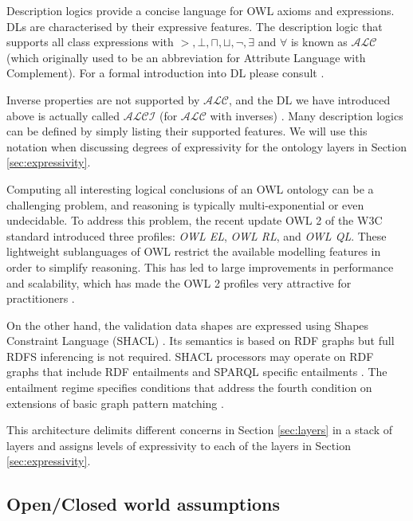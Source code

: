 	Description logics provide a concise language for OWL axioms and expressions. DLs are characterised by their expressive features. The description logic that supports all class expressions with $>, \bot, \sqcap, \sqcup, \neg, \exists$ and $\forall$ is known as $\mathcal{ALC}$ (which originally used to be an abbreviation for Attribute Language with Complement). For a formal introduction into DL please consult \citet{dl-baader2004description}.
	
	Inverse properties are not supported by $\mathcal{ALC}$, and the DL we have introduced above is actually called $\mathcal{ALCI}$ (for $\mathcal{ALC}$ with inverses) \cite{krotzsch2012owl}. Many description logics can be defined by simply listing their supported features. We will use this notation when discussing degrees of expressivity for the ontology layers in Section \ref{sec:expressivity}.
	
	Computing all interesting logical conclusions of an OWL ontology can be a challenging problem, and reasoning is typically multi-exponential or even undecidable. To address this problem, the recent update OWL 2 of the W3C standard \citep{owl2.0,owl2} introduced three profiles: \textit{OWL EL}, \textit{OWL RL}, and \textit{OWL QL}. These lightweight sublanguages of OWL restrict the available modelling features in order to simplify reasoning. This has led to large improvements in performance and scalability, which has made the OWL 2 profiles very attractive for practitioners \citep{krotzsch2012owl}.
	
	On the other hand, the validation data shapes are expressed using Shapes Constraint Language (SHACL) \cite{shacl-spec}. Its semantics is based on RDF graphs but full RDFS inferencing is not required. SHACL processors may operate on RDF graphs that include RDF entailments \citep{rdf11-semantics} and SPARQL specific entailments \citep{sparql11-entailment}. The entailment regime specifies conditions that address the fourth condition on extensions of basic graph pattern matching \citep{rdf-semantics,rdf11-semantics}. 
	
	This architecture delimits different concerns in Section \ref{sec:layers} in a stack of layers and assigns levels of expressivity to each of the layers in Section \ref{sec:expressivity}.
	
	\subsection{Open/Closed world assumptions}
	\label{sec:world-assumption}
	

